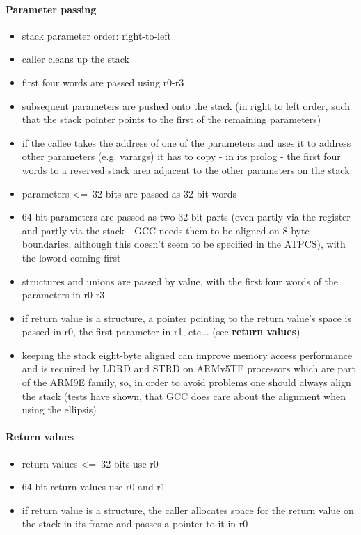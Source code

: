 \paragraph{Parameter passing}

\begin{itemize}
\item stack parameter order: right-to-left
\item caller cleans up the stack
\item first four words are passed using r0-r3
\item subsequent parameters are pushed onto the stack (in right to left order, such that the stack pointer points to the first of the remaining parameters)
\item if the callee takes the address of one of the parameters and uses it to address other parameters (e.g. varargs) it has to copy - in its prolog - the first four words to a reserved stack area adjacent to the other parameters on the stack
\item parameters \textless=\ 32 bits are passed as 32 bit words
\item 64 bit parameters are passed as two 32 bit parts (even partly via the register and partly via the stack - GCC needs them to be aligned on 8 byte boundaries, although this doesn't seem to be specified in the ATPCS), with the loword coming first
\item structures and unions are passed by value, with the first four words of the parameters in r0-r3
\item if return value is a structure, a pointer pointing to the return value's space is passed in r0, the first parameter in r1, etc... (see {\bf return values})
\item keeping the stack eight-byte aligned can improve memory access performance and is required by LDRD and STRD on ARMv5TE processors which are part of the ARM9E family, so, in order to avoid problems one should always align the stack (tests have shown, that GCC does care about the alignment when using the ellipsis)
\end{itemize}

\paragraph{Return values}
\begin{itemize}
\item return values \textless=\ 32 bits use r0
\item 64 bit return values use r0 and r1
\item if return value is a structure, the caller allocates space for the return value on the stack in its frame and passes a pointer to it in r0
\end{itemize}

